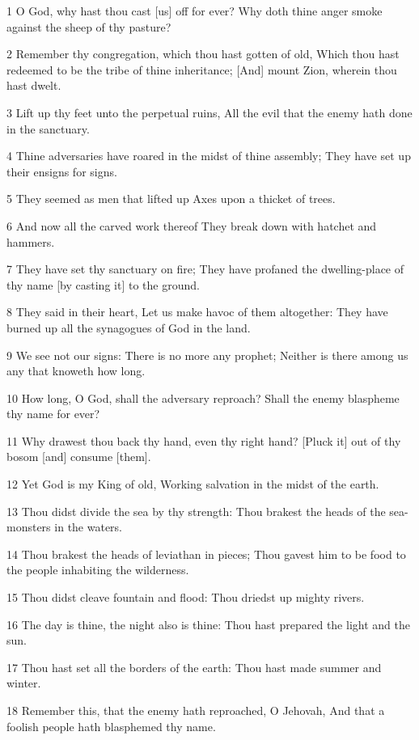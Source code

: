 \par 1 O God, why hast thou cast [us] off for ever? Why doth thine anger smoke against the sheep of thy pasture?
\par 2 Remember thy congregation, which thou hast gotten of old, Which thou hast redeemed to be the tribe of thine inheritance; [And] mount Zion, wherein thou hast dwelt.
\par 3 Lift up thy feet unto the perpetual ruins, All the evil that the enemy hath done in the sanctuary.
\par 4 Thine adversaries have roared in the midst of thine assembly; They have set up their ensigns for signs.
\par 5 They seemed as men that lifted up Axes upon a thicket of trees.
\par 6 And now all the carved work thereof They break down with hatchet and hammers.
\par 7 They have set thy sanctuary on fire; They have profaned the dwelling-place of thy name [by casting it] to the ground.
\par 8 They said in their heart, Let us make havoc of them altogether: They have burned up all the synagogues of God in the land.
\par 9 We see not our signs: There is no more any prophet; Neither is there among us any that knoweth how long.
\par 10 How long, O God, shall the adversary reproach? Shall the enemy blaspheme thy name for ever?
\par 11 Why drawest thou back thy hand, even thy right hand? [Pluck it] out of thy bosom [and] consume [them].
\par 12 Yet God is my King of old, Working salvation in the midst of the earth.
\par 13 Thou didst divide the sea by thy strength: Thou brakest the heads of the sea-monsters in the waters.
\par 14 Thou brakest the heads of leviathan in pieces; Thou gavest him to be food to the people inhabiting the wilderness.
\par 15 Thou didst cleave fountain and flood: Thou driedst up mighty rivers.
\par 16 The day is thine, the night also is thine: Thou hast prepared the light and the sun.
\par 17 Thou hast set all the borders of the earth: Thou hast made summer and winter.
\par 18 Remember this, that the enemy hath reproached, O Jehovah, And that a foolish people hath blasphemed thy name.

